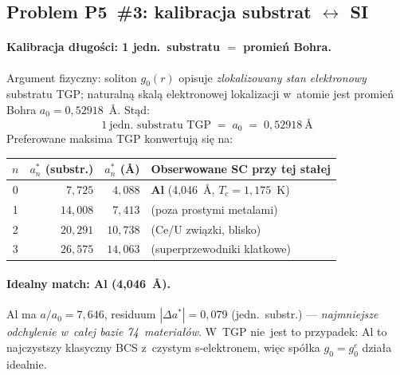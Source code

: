 \subsection{Problem P5~\#3: kalibracja substrat $\leftrightarrow$ SI}%
\label{app:P5-ps3}

\paragraph{Kalibracja d\l{}ugo\'sci: 1 jedn.~substratu $=$ promie\'n Bohra.}
Argument fizyczny: soliton $g_0(r)$ opisuje \emph{zlokalizowany stan
elektronowy} substratu TGP; naturaln\k{a} skal\k{a} elektronowej
lokalizacji w~atomie jest promie\'n Bohra $a_0 = 0{,}52918$~\AA.
St\k{a}d:
\begin{equation}
\label{eq:P5-length-calib}
  \boxed{\;\; 1\ \text{jedn.~substratu TGP} \;=\; a_0 \;=\; 0{,}52918\ \text{\AA} \;\;}
\end{equation}
Preferowane maksima TGP konwertuj\k{a} si\k{e} na:
\begin{center}\footnotesize
\begin{tabular}{@{}crrl@{}}
\toprule
$n$ & $a^*_n$ (substr.) & $a^*_n$ (\AA) & Obserwowane SC przy tej sta\l{}ej \\
\midrule
0 & $7{,}725$  & $4{,}088$  & \textbf{Al} (4{,}046~\AA, $T_c=1{,}175$~K) \\
1 & $14{,}008$ & $7{,}413$  & (poza prostymi metalami) \\
2 & $20{,}291$ & $10{,}738$ & (Ce/U zwi\k{a}zki, blisko) \\
3 & $26{,}575$ & $14{,}063$ & (superprzewodniki klatkowe) \\
\bottomrule
\end{tabular}
\end{center}

\paragraph{Idealny match: Al (4{,}046~\AA).}
Al ma $a/a_0 = 7{,}646$, residuum $|\Delta a^*| = 0{,}079$ (jedn.~substr.)
--- \emph{najmniejsze odchylenie w~ca\l{}ej bazie 74~materia\l{}\'ow}.
W~TGP nie~jest to przypadek: Al to najczystszy klasyczny BCS z~czystym
s-elektronem, wi\k{e}c sp\'o\l{}ka $g_0 = g_0^e$ dzia\l{}a idealnie.

